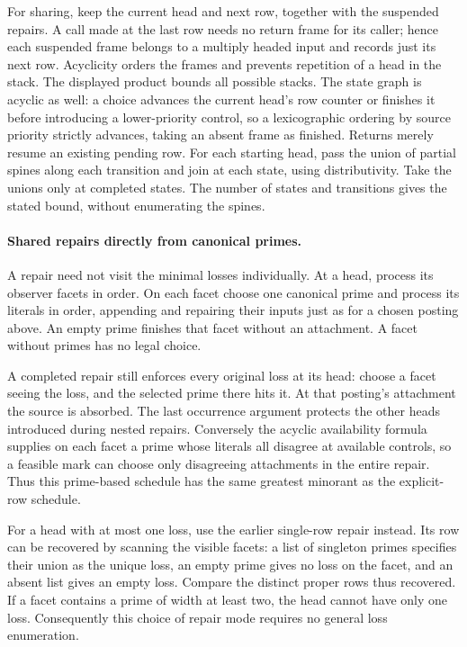 For sharing, keep the current head and next row,
together with the suspended repairs. A call made
at the last row needs no return frame for its
caller; hence each suspended frame belongs to a
multiply headed input and records just its next
row. Acyclicity orders the frames and prevents
repetition of a head in the stack. The displayed
product bounds all possible stacks. The state
graph is acyclic as well: a choice advances the
current head's row counter or finishes it before
introducing a lower-priority control, so a
lexicographic ordering by source priority
strictly advances, taking an absent frame as
finished. Returns merely resume an existing
pending row. For each starting head, pass the
union of partial spines along each transition
and join at each state, using distributivity.
Take the unions only at completed states.
The number of states and transitions gives the
stated bound, without enumerating the spines.

\paragraph{Shared repairs directly from canonical primes.}
A repair need not visit the minimal losses individually.
At a head, process its observer facets in order.
On each facet choose one canonical prime and process
its literals in order, appending and repairing their
inputs just as for a chosen posting above. An empty
prime finishes that facet without an attachment.
A facet without primes has no legal choice.

A completed repair still enforces every original
loss at its head: choose a facet seeing the loss,
and the selected prime there hits it. At that
posting's attachment the source is absorbed.
The last occurrence argument protects the other
heads introduced during nested repairs. Conversely
the acyclic availability formula supplies on each
facet a prime whose literals all disagree at
available controls, so a feasible mark can choose
only disagreeing attachments in the entire repair.
Thus this prime-based schedule has the same greatest
minorant as the explicit-row schedule.

For a head with at most one loss, use the earlier
single-row repair instead. Its row can be recovered
by scanning the visible facets: a list of singleton
primes specifies their union as the unique loss,
an empty prime gives no loss on the facet, and
an absent list gives an empty loss. Compare the
distinct proper rows thus recovered. If a facet
contains a prime of width at least two, the head
cannot have only one loss. Consequently this choice
of repair mode requires no general loss enumeration.


